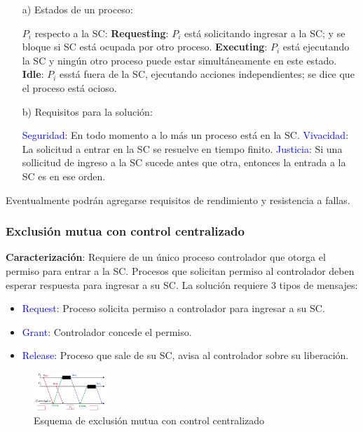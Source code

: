 \begin{itemize}
    \item[a)] Estados de un proceso:
    
    $P_i$ respecto a la SC: \textbf{Requesting}: $P_i$ está solicitando ingresar a la SC; y se bloque si SC está ocupada por otro proceso. \textbf{Executing}: $P_i$ está ejecutando la SC y ningún otro proceso puede estar simultáneamente en este estado. \textbf{Idle}: $P_i$ esstá fuera de la SC, ejecutando acciones independientes; se dice que el proceso está ocioso.

    \item[b)] Requisitos para la solución:
    
    \textcolor{blue}{Seguridad}: En todo momento a lo más un proceso está en la SC. \textcolor{blue}{Vivacidad}: La solicitud a entrar en la SC se resuelve en tiempo finito. \textcolor{blue}{Justicia}: Si una sollicitud de ingreso a la SC sucede antes que otra, entonces la entrada a la SC es en ese orden.
\end{itemize}

Eventualmente podrán agregarse requisitos de rendimiento y resistencia a fallas.

\subsubsection{Exclusión mutua con control centralizado}

\textbf{Caracterización}: Requiere de un único proceso controlador que otorga el permiso para entrar a la SC. Procesos que solicitan permiso al controlador deben esperar respuesta para ingresar a su SC. La solución requiere 3 tipos de mensajes: 

\begin{itemize}
    \item \textcolor{blue}{Request}: Proceso solicita permiso a controlador para ingresar a su SC.
    \item \textcolor{blue}{Grant}: Controlador concede el permiso.
    \item \textcolor{blue}{Release}: Proceso que sale de su SC, avisa al controlador sobre su liberación.
\end{itemize}

\begin{figure}[H]
    \centering
    \includegraphics[width=0.25\textwidth]{img/E_M_Control_Centralizado.png}
    \caption{Esquema de exclusión mutua con control centralizado}
\end{figure}

